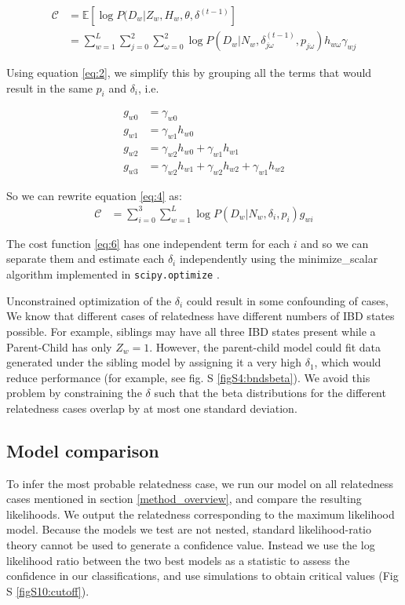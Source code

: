 \documentclass[12pt, letterpaper]{article}
\begin{document}
\begin{align}\label{eq:4}
\mathcal{C} &= \mathbb{E}[\log P(D_w|Z_w, H_w, \theta, \delta^{(t-1)}]\nonumber\\
&= \sum_{w=1}^L \sum_{j=0}^2\sum^2_{\omega=0} \log P(D_{w}|N_w, \delta_{j \omega}^{(t-1)}, p_{j \omega})h_{w\omega}\gamma_{wj}
\end{align}


Using equation \ref{eq:2}, we simplify this by grouping all the terms that would result in the same $p_i$ and $\delta_i$, i.e.

\begin{align*}\label{eq:5}
g_{w0} &= \gamma_{w0}\\
g_{w1} &= \gamma_{w1} h_{w0}\\
g_{w2} &= \gamma_{w2} h_{w0} + \gamma_{w1} h_{w1}\\
g_{w3} &= \gamma_{w2} h_{w1} + \gamma_{w2} h_{w2} + \gamma_{w1} h_{w2}
\end{align*}

So we can rewrite equation \ref{eq:4} as:
\begin{align}\label{eq:6}
\mathcal{C} &= \sum_{i=0}^3 \sum_{w=1}^L \log P(D_{w}|N_w, \delta_i, p_i)g_{wi}
\end{align}

The cost function \ref{eq:6} has one independent term for each $i$ and so we can separate them and estimate each $\delta_i$ independently using the minimize\_scalar algorithm implemented in \texttt{scipy.optimize} \cite{virtanen_scipy_2020}. 


Unconstrained optimization of the $\delta_i$ could result in some confounding of cases, We know that different cases of relatedness have different numbers of IBD states possible. For example, siblings may have all three IBD states present while a Parent-Child has only $Z_w=1$. However, the parent-child model could fit data generated under the sibling model by assigning it a very high $\delta_1$, which would reduce performance  (for example, see fig. S \ref{figS4:bndsbeta}). We avoid this problem by constraining the $\delta$ such that the beta distributions for the different relatedness cases overlap by at most one standard deviation.

\subsection{Model comparison}\label{model_comp}
To infer the most probable relatedness case, we run our model on all relatedness cases mentioned in section \ref{method_overview}, and compare the resulting likelihoods. We output the relatedness corresponding to the maximum likelihood model. Because the models we test are not nested, standard likelihood-ratio theory cannot be used to generate a confidence value. Instead we use the log likelihood ratio between the two best models as a statistic to assess the confidence in our classifications, and use simulations to obtain critical values (Fig S \ref{figS10:cutoff}).
\end{document}
